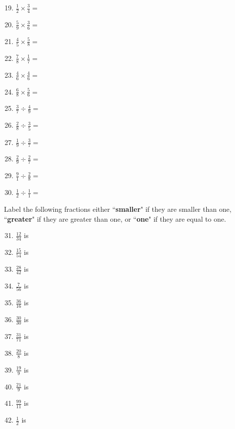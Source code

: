 \documentclass[12pt]{article}
\theoremstyle{definition}
\begin{document}
\begin{multicols}{2}
\begin{enumerate}[1)]\setcounter{enumi}{18}
	\item \large{$\frac{1}{2} \times \frac{3}{4}= $}
	\item \large{$\frac{5}{9} \times \frac{3}{6}= $}
	\item \large{$\frac{4}{5} \times \frac{5}{8}= $}
	\item \large{$\frac{7}{8} \times \frac{1}{7}= $}
	\item \large{$\frac{4}{6} \times \frac{4}{6}= $}
	\item \large{$\frac{6}{8} \times \frac{5}{6}= $}
	\item \large{$\frac{3}{7} \div \frac{4}{9}= $}
	\item \large{$\frac{2}{8} \div \frac{3}{5}= $}
	\item \large{$\frac{1}{9} \div \frac{3}{7}= $}
	\item \large{$\frac{2}{9} \div \frac{2}{7}= $}
	\item \large{$\frac{9}{1} \div \frac{2}{8}= $}
	\item \large{$\frac{1}{2} \div \frac{1}{1}= $}
\end{enumerate}
\end{multicols}
Label the following fractions either ``\textbf{smaller}" if they are smaller than one, ``\textbf{greater}" if they are greater than one, or ``\textbf{one}" if they are equal to one.
\begin{multicols}{2}
	\begin{enumerate}[1)]\setcounter{enumi}{30}
		\item \large{$\frac{12}{34}$}\textrm{ is}
		\item \large{$\frac{15}{54}$}\textrm{ is}
		\item \large{$\frac{28}{42}$}\textrm{ is}
		\item \large{$\frac{7}{56}$}\textrm{ is}
		\item \large{$\frac{36}{16}$}\textrm{ is}
		\item \large{$\frac{30}{30}$}\textrm{ is}
		\item \large{$\frac{31}{71}$}\textrm{ is}
		\item \large{$\frac{20}{8}$} \textrm{ is}
		\item \large{$\frac{19}{9}$}\textrm{ is}
		\item \large{$\frac{21}{9}$}\textrm{ is}
		\item \large{$\frac{99}{11}$}\textrm{ is}
		\item \large{$\frac{1}{2}$}\textrm{ is}
	\end{enumerate}
\end{multicols}

	





\end{document}
